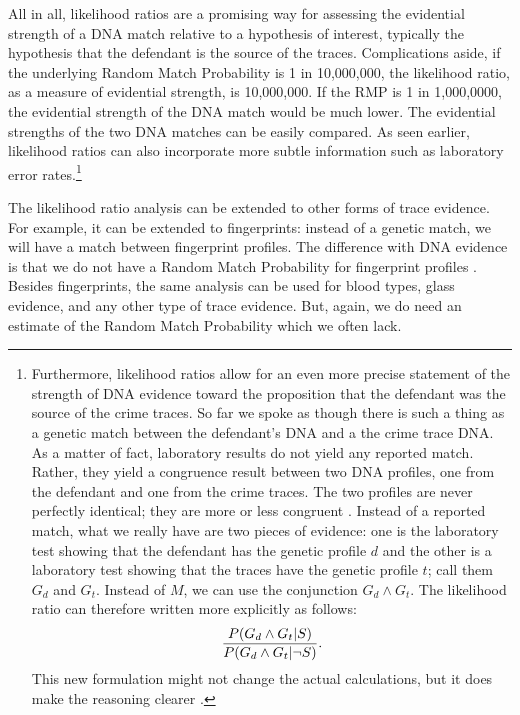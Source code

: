 \documentclass[10pt]{article}
\begin{document}
All in all, likelihood ratios are a promising way for assessing the evidential strength of a DNA 
match relative to a hypothesis of interest, typically the hypothesis that the defendant is the source of the traces. 
Complications aside, if the underlying Random Match Probability is 1 in 10,000,000,  
the likelihood ratio, as a measure of evidential strength, is 10,000,000.
If the RMP is 1 in 1,000,0000, the evidential strength of the 
DNA match would be much lower. The evidential strengths of the two DNA matches can 
be easily compared. As seen earlier, likelihood ratios can also incorporate more subtle information such 
as laboratory error rates.\footnote{Furthermore, likelihood ratios allow for an even more precise statement of the strength 
of DNA evidence toward the proposition that the defendant was the source of the crime traces. 
So far we spoke as though there is such a thing as a genetic match between the defendant's DNA and a the crime trace DNA. 
As a matter of fact, laboratory results do not yield any reported match. Rather, they yield a 
congruence result between two DNA profiles, one from the defendant and one from the crime traces.
The two profiles are never perfectly identical; they are more or less congruent \citep{Kaye1993Dna}. Instead of a reported match, what we really have 
are two pieces of evidence: one is the laboratory test showing that the defendant has the genetic profile $d$ 
and the other is a laboratory test showing that the traces have the genetic profile $t$; call them 
$G_d$ and $G_t$. Instead of $M$, we can use the conjunction $G_d \wedge G_t$. 
The likelihood ratio can therefore written more explicitly as follows:
%
\[
{P(G_d \wedge G_t | S) \over P(G_d \wedge G_t | \neg S)}.
\]
%
This new formulation might not change the actual calculations, but 
it does make the reasoning clearer \citep{Robertson1995DNA-Evidence:-W}.}

The likelihood ratio analysis can be extended to other forms of trace evidence. For example, it can 
be extended to fingerprints: instead of a genetic match, we will have a match 
between fingerprint profiles. The difference with DNA evidence is that we do not have a 
Random Match Probability for fingerprint profiles \citep{Zabell2005Fingerprint-Evi}. Besides fingerprints, the same 
analysis can be used for blood types, glass evidence, and any other type of trace evidence. 
But, again, we do need an estimate of the Random Match Probability 
which we often lack. 
\end{document}
